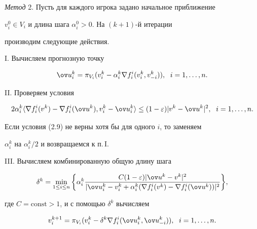 {\it Метод} 2. Пусть для каждого игрока задано начальное приближение 


$v^0_i\in V_i$ и длина шага $\alpha^0_i>0$. На $(k+1)$-й итерации 


производим следующие действия. 


 


I. Вычисляем прогнозную точку 


\begin{equation} 


\ov u{}^k_i=\pi_{V_i}(v^k_i-\alpha^k_i\nabla 


f^i_i(v^k_i,v^k_{-i})),\ \; i=1,\dotsc,n. 


\end{equation} 





II. Проверяем условия 


\begin{equation} 


2\alpha^k_i\la\nabla f^i_i(v^k)-\nabla f^i_i 


(\ov u{}^k),v^k_i-\ov u{}^k_i\ra\le(1-\varepsilon) 


|v^k-\ov u{}^k|^2,\ \; i=1,\dotsc,n.


\end{equation} 


Если условия (2.9) не верны хотя бы для одного $i$, то заменяем 


$\alpha^k_i$ на $\alpha^k_i/2$ и возвращаемся к п.\,I. 


 


III. Вычисляем комбинированную общую длину шага 


\begin{equation} 


\delta^k=\min_{1\le i\le n}\bigg\{\alpha^k_i 


\frac{C(1-\varepsilon)|\ov u{}^k-v^k|^2} 


{|\ov u{}^k_i-v^k_i+\alpha^k_i(\nabla f^i_i(v^k)- 


\nabla f^i_i(\ov u{}^k))|^2}\bigg\}, 


\end{equation} 


где $C=\text{const}>1$, и с помощью $\delta^k$ вычисляем 


\begin{equation} 


v^{k+1}_i=\pi_{V_i}(v^k_i-\delta^k\nabla 


f^i_i(\ov u{}^k_i,\ov u{}^k_{-i})),\ \; i=1,\dotsc,n. 


\end{equation} 


